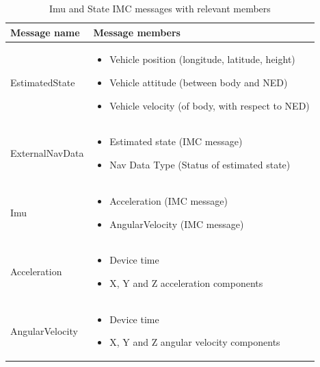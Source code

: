     \begin{table}[!htbp]
    \centering
    \begin{tabularx}{\textwidth}{ |l|X| }\hline
        \textbf{Message name}   & \textbf{Message members}  \\\hline
        EstimatedState & 
        \begin{minipage}[t]{0.7\textwidth}
            \begin{itemize}
                \item Vehicle position (longitude, latitude, height)
                \item Vehicle attitude (between body and NED)
                \item Vehicle velocity (of body, with respect to NED)
            \end{itemize}
        \end{minipage}\\\hline
        ExternalNavData & 
        \begin{minipage}[t]{0.7\textwidth}
            \begin{itemize}
                \item Estimated state (IMC message)
                \item Nav Data Type (Status of estimated state)
            \end{itemize}
        \end{minipage}\\\hline
        Imu &
        \begin{minipage}[t]{0.7\textwidth}
            \begin{itemize}
                \item Acceleration (IMC message)
                \item AngularVelocity (IMC message)
            \end{itemize}
        \end{minipage}\\\hline
        Acceleration & 
        \begin{minipage}[t]{0.7\textwidth}
            \begin{itemize}
                \item Device time
                \item X, Y and Z acceleration components
            \end{itemize}
        \end{minipage}\\\hline
        AngularVelocity & 
        \begin{minipage}[t]{0.7\textwidth}
            \begin{itemize}
                \item Device time
                \item X, Y and Z angular velocity components
            \end{itemize}
        \end{minipage}\\\hline
    \end{tabularx}
    \caption{Imu and State IMC messages with relevant members}
    \label{tab:imc-filter}
    \end{table}
